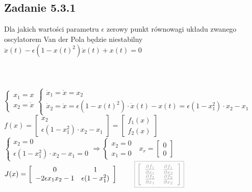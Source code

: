 \subsection*{Zadanie 5.3.1} {\color{darkgray}
	Dla jakich wartości parametru $\epsilon$ zerowy punkt równowagi układu zwanego oscylatorem Van der Pola będzie niestabilny\\
	$\ddot{x}(t)-\epsilon(1-x(t)^2)\dot{x}(t)+x(t)=0$\\\\
}\lineh
\\\\
$\begin{cases} x_1=x \\ x_2 =\dot{x} \end{cases} \begin{cases} \dot{x}_1=\dot{x}=x_2 \\ \dot{x}_2=\ddot{x}= \epsilon(1-x(t)^2) \cdot \dot{x}(t)-x(t)=\epsilon(1-x_1^2) \cdot x_2 - x_1 \end{cases}$\\
$f(x)=\left[ \begin{array}{c}   x_2  \\  \epsilon(1-x_1^2) \cdot x_2 - x_1  \end{array}\right] = \left[ \begin{array}{c}  f_1(x)   \\ f_2(x)   \end{array}\right]$\\
$\begin{cases} x_2=0 \\ \epsilon(1-x_1^2) \cdot x_2 - x_1 = 0\end {cases} \Rightarrow \begin{cases}x_2=0 \\ x_1 = 0 \end {cases} \ \ \ x_r = \left[ \begin{array}{c}     0\\0   \end{array}\right]$\\
$J(x)=\left[ \begin{array}{cc}   0 &1  \\ -2\epsilon x_1 x_2 -1 & \epsilon(1-x_1^2)   \end{array}\right] \ \ \ \ \ \ \ 
{\color{lightgray}\boxed{\left[ \begin{array}{cc}    \frac{\partial f_1}{\partial x_1} &\frac{\partial f_1}{\partial x_2} \\ \frac{\partial f_2}{\partial x_1} & \frac{\partial f_2}{\partial x_2}   \end{array}\right]}}$\\
